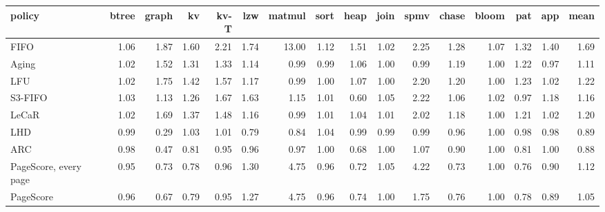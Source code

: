 \begin{tabular}{lrrrrrrrrrrrrrrr}
\toprule
policy & btree & graph & kv & kv-T & lzw & matmul & sort & heap & join & spmv & chase & bloom & pat & app & mean \\
\midrule
FIFO & 1.06 & 1.87 & 1.60 & 2.21 & 1.74 & 13.00 & 1.12 & 1.51 & 1.02 & 2.25 & 1.28 & 1.07 & 1.32 & 1.40 & 1.69 \\
Aging & 1.02 & 1.52 & 1.31 & 1.33 & 1.14 & 0.99 & 0.99 & 1.06 & 1.00 & 0.99 & 1.19 & 1.00 & 1.22 & 0.97 & 1.11 \\
LFU & 1.02 & 1.75 & 1.42 & 1.57 & 1.17 & 0.99 & 1.00 & 1.07 & 1.00 & 2.20 & 1.20 & 1.00 & 1.23 & 1.02 & 1.22 \\
S3-FIFO & 1.03 & 1.13 & 1.26 & 1.67 & 1.63 & 1.15 & 1.01 & 0.60 & 1.05 & 2.22 & 1.06 & 1.02 & 0.97 & 1.18 & 1.16 \\
LeCaR & 1.02 & 1.69 & 1.37 & 1.48 & 1.16 & 0.99 & 1.01 & 1.04 & 1.01 & 2.02 & 1.18 & 1.00 & 1.21 & 1.02 & 1.20 \\
LHD & 0.99 & 0.29 & 1.03 & 1.01 & 0.79 & 0.84 & 1.04 & 0.99 & 0.99 & 0.99 & 0.96 & 1.00 & 0.98 & 0.98 & 0.89 \\
ARC & 0.98 & 0.47 & 0.81 & 0.95 & 0.96 & 0.97 & 1.00 & 0.68 & 1.00 & 1.07 & 0.90 & 1.00 & 0.81 & 1.00 & 0.88 \\
PageScore, every page & 0.95 & 0.73 & 0.78 & 0.96 & 1.30 & 4.75 & 0.96 & 0.72 & 1.05 & 4.22 & 0.73 & 1.00 & 0.76 & 0.90 & 1.12 \\
PageScore & 0.96 & 0.67 & 0.79 & 0.95 & 1.27 & 4.75 & 0.96 & 0.74 & 1.00 & 1.75 & 0.76 & 1.00 & 0.78 & 0.89 & 1.05 \\
\bottomrule
\end{tabular}
